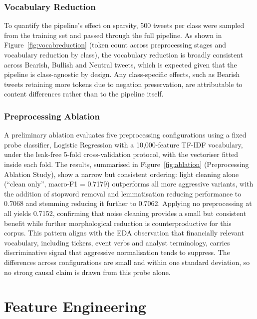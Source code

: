 \documentclass[11pt,a4paper]{article}
\begin{document}
\subsubsection{Vocabulary Reduction}

To quantify the pipeline's effect on sparsity, 500 tweets per class were sampled from the
training set and passed through the full pipeline. As shown in
Figure~\ref{fig:vocabreduction} (token count across preprocessing stages and vocabulary
reduction by class), the vocabulary reduction is broadly
consistent across Bearish, Bullish and Neutral tweets, which is expected given that the
pipeline is class-agnostic by design. Any class-specific effects, such as Bearish tweets
retaining more tokens due to negation preservation, are attributable to content
differences rather than to the pipeline itself.

\subsubsection{Preprocessing Ablation}

A preliminary ablation evaluates five preprocessing configurations using a fixed probe
classifier, Logistic Regression with a 10{,}000-feature TF-IDF vocabulary, under the
leak-free 5-fold cross-validation protocol, with the vectoriser fitted inside each fold.
The results, summarised in Figure~\ref{fig:ablation} (Preprocessing Ablation Study), show a narrow but consistent ordering: light cleaning alone
(``clean only'', macro-F1 = 0.7179) outperforms all more aggressive variants, with the
addition of stopword removal and lemmatisation reducing performance to 0.7068 and
stemming reducing it further to 0.7062. Applying no preprocessing at all yields 0.7152,
confirming that noise cleaning provides a small but consistent benefit while further
morphological reduction is counterproductive for this corpus. This pattern aligns with the
EDA observation that financially relevant vocabulary, including tickers, event verbs and
analyst terminology, carries discriminative signal that aggressive normalisation tends to
suppress. The differences across configurations are small and within one standard
deviation, so no strong causal claim is drawn from this probe alone.


\section{Feature Engineering}
\end{document}
